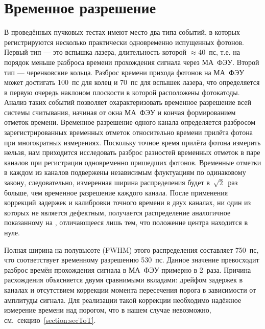\section{Временное разрешение}\label{section:TimeRes}

В проведённых пучковых тестах имеют место два типа событий, в которых регистрируются несколько практически одновременно испущенных фотонов. Первый тип --- это вспышка лазера, длительность которой $\approx$40~пс, т.е. на порядок меньше разброса времени прохождения сигнала через МА~ФЭУ. Второй тип --- черенковские кольца. Разброс времени прихода фотонов на МА~ФЭУ может достигать 100~пс для колец и 70~пс для вспышек лазера, что определяется в первую очередь наклоном плоскости в которой расположены фотокатоды. Анализ таких событий позволяет охарактеризовать временное разрешение всей системы считывания, начиная от окна МА~ФЭУ и кончая формированием отметок времени. Временное разрешение одного канала определяется разбросом зарегистрированных временных отметок относительно времени прилёта фотона при многократных измерениях. Поскольку точное время прилёта фотона измерить нельзя, нам приходится исследовать разброс разностей временных отметок в паре каналов при регистрации одновременно пришедших фотонов. Временные отметки в каждом из каналов подвержены независимым флуктуациям по одинаковому закону, следовательно, измеренная ширина распределения будет в~$\sqrt 2$~раз больше, чем временное разрешение каждого канала.
После применения коррекций задержек и калибровки точного времени в двух каналах, ни один из которых не является дефектным, получается распределение аналогичное показанному на , отличающееся лишь тем, что положение центра находится в нуле.


Полная ширина на полувысоте (FWHM) этого распределения составляет 750~пс, что соответствует временному разрешению 530~пс. Данное значение превосходит разброс времён прохождения сигнала в МА~ФЭУ примерно в 2~раза. Причина расхождения объясняется двумя сравнимыми вкладами: дрейфом задержек в каналах и отсутствием коррекции момента пересечения порога в зависимости от амплитуды сигнала. Для реализации такой коррекции необходимо надёжное измерение времени над порогом, что в нашем случае невозможно, см.~секцию~\ref{section:secToT}.

